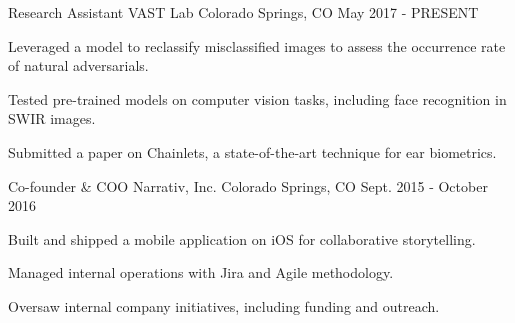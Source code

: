 

\begin{cventries}

  \cventry
    {Research Assistant} %
    {VAST Lab} %
    {Colorado Springs, CO} %
    {May 2017 - PRESENT} %
    {
      \begin{cvitems} %
        \item {Leveraged a model to reclassify misclassified images to assess the occurrence rate of natural adversarials.}
        \item {Tested pre-trained models on computer vision tasks, including face recognition in SWIR images.}
        \item {Submitted a paper on Chainlets, a state-of-the-art technique for ear biometrics.}
      \end{cvitems}
    }

  \cventry
    {Co-founder \& COO} %
    {Narrativ, Inc.} %
    {Colorado Springs, CO} %
    {Sept. 2015 - October 2016} %
    {
      \begin{cvitems} %
        \item {Built and shipped a mobile application on iOS for collaborative storytelling. }
        \item {Managed internal operations with Jira and Agile methodology. }
        \item {Oversaw internal company initiatives, including funding and outreach. }
      \end{cvitems}
    }

\end{cventries}
